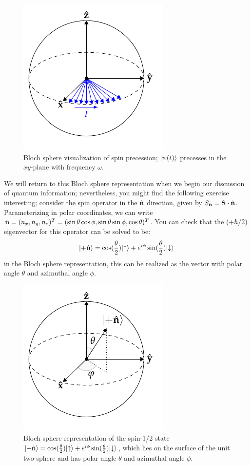 \begin{figure}[htbp]
    \centering
    \includegraphics{Images/fig-spinprecess.pdf}
    \caption{Bloch sphere visualization of spin precession; $\lvert \psi(t) \rangle$ precesses in the $xy$-plane with frequency $\omega$.}
    \label{fig-spinprecess}
\end{figure}


We will return to this Bloch sphere representation when we begin our discussion of quantum information; nevertheless, you might find the following exercise interesting; consider the spin operator in the $\hat{\mathbf{n}}$ direction, given by $S_{\hat{\mathbf{n}}} = \mathbf{S} \cdot \hat{\mathbf{n}}$. Parameterizing in polar coordinates, we can write $\hat{\v{n}} = (n_x, n_y, n_z)^T = (\sin\theta\cos\phi, \sin\theta\sin\phi, \cos\theta)^T$. You can check that the ($+\hbar/2$) eigenvector for this operator can be solved to be:
\begin{equation}\label{eq-nhatspin}
    \ket{+\hat{\v{n}}} = \cos(\frac{\theta}{2})\ket{\uparrow} + e^{i\phi}\sin(\frac{\theta}{2})\ket{\downarrow}
\end{equation}
in the Bloch sphere representation, this can be realized as the vector with polar angle $\theta$ and azimuthal angle $\phi$.

\begin{figure}[htbp]
    \centering
    \includegraphics{Images/fig-Blochsphere.pdf}
    \caption{Bloch sphere representation of the spin-1/2 state $\ket{+\hat{\v{n}}} = \cos(\frac{\theta}{2})\ket{\uparrow} + e^{i\phi}\sin(\frac{\theta}{2})\ket{\downarrow}$, which lies on the surface of the unit two-sphere and has polar angle $\theta$ and azimuthal angle $\phi$.}
    \label{fig-Blochsphere}
\end{figure}

